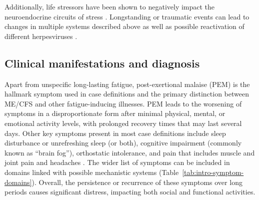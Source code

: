 Additionally, life stressors have been shown to negatively impact the neuroendocrine circuits of stress \citep{stojanovich2008StressTrigger, bested2015ReviewMyalgic}.
Longstanding or traumatic events can lead to changes in multiple systems described above as well as possible reactivation of different herpesviruses \citep{segerstrom2004PsychologicalStress, kuratsune2008ChronicFatigue, rivera2019MyalgicEncephalomyelitis}.



\subsection{Clinical manifestations and diagnosis}
\label{subsec:sym-and-diagnosis}

Apart from unspecific long-lasting fatigue, post-exertional malaise (PEM) is the hallmark symptom used in case definitions and the primary distinction between ME/CFS and other fatigue-inducing illnesses. PEM leads to the worsening of symptoms in a disproportionate form after minimal physical, mental, or emotional activity levels, with prolonged recovery times that may last several days. Other key symptoms present in most case definitions include sleep disturbance or unrefreshing sleep (or both), cognitive impairment (commonly known as ``brain fog''), orthostatic intolerance, and pain that includes muscle and joint pain and headaches \citep{lim2020SystematicReviewa}. The wider list of symptoms can be included in domains linked with possible mechanistic systems (Table~\ref{tab:intro-symptom-domains}). Overall, the persistence or recurrence of these symptoms over long periods causes significant distress, impacting both social and functional activities.

